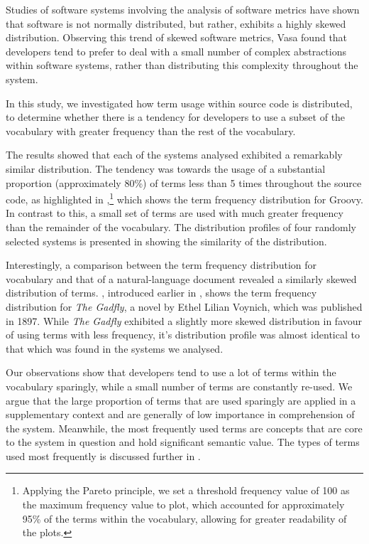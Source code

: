 Studies of software systems involving the analysis of software metrics have shown that software is not normally distributed, but rather, exhibits a highly skewed distribution. Observing this trend of skewed software metrics, Vasa \cite{Vasa10a} found that developers tend to prefer to deal with a small number of complex abstractions within software systems, rather than distributing this complexity throughout the system.

In this study, we investigated how term usage within source code is distributed, to determine whether there is a tendency for developers to use a subset of the vocabulary with greater frequency than the rest of the vocabulary.

The results showed that each of the systems analysed exhibited a remarkably similar distribution. The tendency was towards the usage of a substantial proportion (approximately 80\%) of terms less than 5 times throughout the source code, as highlighted in ,\footnote{Applying the Pareto principle, we set a threshold frequency value of 100 as the maximum frequency value to plot, which accounted for approximately 95\% of the terms within the vocabulary, allowing for greater readability of the plots.} which shows the term frequency distribution for Groovy. In contrast to this, a small set of terms are used with much greater frequency than the remainder of the vocabulary. The distribution profiles of four randomly selected systems is presented in  showing the similarity of the distribution.

Interestingly, a comparison between the term frequency distribution for vocabulary and that of a natural-language document revealed a similarly skewed distribution of terms. , introduced earlier in , shows the term frequency distribution for \emph{The Gadfly}, a novel by Ethel Lilian Voynich, which was published in 1897. While \emph{The Gadfly} exhibited a slightly more skewed distribution in favour of using terms with less frequency, it's distribution profile was almost identical to that which was found in the systems we analysed.

Our observations show that developers tend to use a lot of terms within the vocabulary sparingly, while a small number of terms are constantly re-used. We argue that the large proportion of terms that are used sparingly are applied in a supplementary context and are generally of low importance in comprehension of the system. Meanwhile, the most frequently used terms are concepts that are core to the system in question and hold significant semantic value. The types of terms used most frequently is discussed further in .

